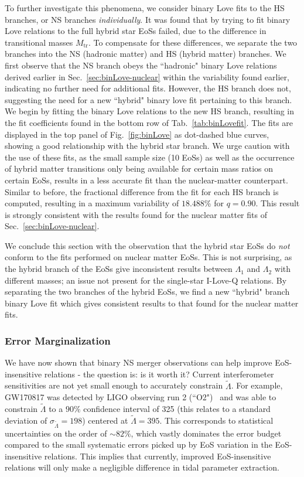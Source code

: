 \documentclass[prd,twocolumn,nofootinbib,superscriptaddress,amsmath,amssymb]{revtex4-1}
\begin{document}
To further investigate this phenomena, we consider binary Love fits to the HS branches, or NS branches \emph{individually}.
It was found that by trying to fit binary Love relations to the full hybrid star EoSs failed, due to the difference in transitional masses $M_{\text{tr}}$.
To compensate for these differences, we separate the two branches into the NS (hadronic matter) and HS (hybrid matter) branches.
We first observe that the NS branch obeys the ``hadronic" binary Love relations derived earlier in Sec.~\ref{sec:binLove-nuclear} within the variability found earlier, indicating no further need for additional fits.
However, the HS branch does not, suggesting the need for a new ``hybrid" binary love fit pertaining to this branch.
We begin by fitting the binary Love relations to the new HS branch, resulting in the fit coefficients found in the bottom row of Tab.~\ref{tab:binLovefit}.
The fits are displayed in the top panel of Fig.~\ref{fig:binLove} as dot-dashed blue curves, showing a good relationship with the hybrid star branch.
We urge caution with the use of these fits, as the small sample size (10 EoSs) as well as the occurrence of hybrid matter transitions only being available for certain mass ratios on certain EoSs, results in a less accurate fit than the nuclear-matter counterpart.
Similar to before, the fractional difference from the fit for each HS branch is computed, resulting in a maximum variability of $18.488$\% for $q=0.90$.
This result is strongly consistent with the results found for the nuclear matter fits of Sec.~\ref{sec:binLove-nuclear}.

We conclude this section with the observation that the hybrid star EoSs do \emph{not} conform to the fits performed on nuclear matter EoSs.
This is not surprising, as the hybrid branch of the EoSs give inconsistent results between $\Lambda_1$ and $\Lambda_2$ with different masses; an issue not present for the single-star I-Love-Q relations.
By separating the two branches of the hybrid EoSs, we find a new ``hybrid" branch binary Love fit which gives consistent results to that found for the nuclear matter fits.

\subsubsection{Error Marginalization}
We have now shown that binary NS merger observations can help improve EoS-insensitive relations - the question is: is it worth it?
Current interferometer sensitivities are not yet small enough to accurately constrain $\tilde{\Lambda}$.
For example, GW170817 was detected by LIGO observing run 2 (``O2")~\cite{aLIGO} and was able to constrain $\tilde{\Lambda}$ to a $90\%$ confidence interval of 325 (this relates to a standard deviation of $\sigma_{\tilde{\Lambda}}=198$) centered at $\tilde{\Lambda}=395$.
This corresponds to statistical uncertainties on the order of $\sim 82\%$, which vastly dominates the error budget compared to the small systematic errors picked up by EoS variation in the EoS-insensitive relations.
This implies that currently, improved EoS-insensitive relations will only make a negligible difference in tidal parameter extraction.
\end{document}
